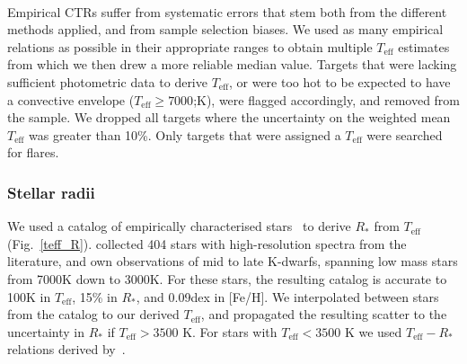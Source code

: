 \documentclass{aa}
\begin{document}
\\
Empirical CTRs suffer from systematic errors that stem both from the different methods applied, and from sample selection biases. We used as many empirical relations as possible in their appropriate ranges to obtain multiple $T_\mathrm{eff}$ estimates from which we then drew a more reliable median value. Targets that were lacking sufficient photometric data to derive $T_\mathrm{eff}$, or were too hot to be expected to have a convective envelope ($T_\mathrm{eff} \geq 7000$;K), were flagged accordingly, and removed from the sample. We dropped all targets where the uncertainty on the weighted mean $T_\mathrm{eff}$ was greater than 10\%. Only targets that were assigned a $T_\mathrm{eff}$ were searched for flares. 
\subsubsection{Stellar radii}
We used a catalog of empirically characterised stars~\citep{yee_specmatch_2017} to derive $R_*$ from $T_\mathrm{eff}$ (Fig.~\ref{teff_R}). \citet{yee_specmatch_2017} collected 404 stars with high-resolution spectra from the literature, and own observations of mid to late K-dwarfs, spanning low mass stars from 7000\;K down to 3000\;K. For these stars, the resulting catalog is accurate to 100\;K in
$T_\mathrm{eff}$, 15\;\% in $R_*$, and 0.09\;dex in [Fe/H]. We interpolated between stars from the catalog to our derived $T_\mathrm{eff}$,  and propagated the resulting scatter to the uncertainty in $R_*$ if $T_\mathrm{eff}>3500$ K. For stars with $T_\mathrm{eff}< 3500$ K we used $T_\mathrm{eff}-R_*$ relations derived by~\citep{mann_how_2015,mann_erratum_2016}.
\end{document}
